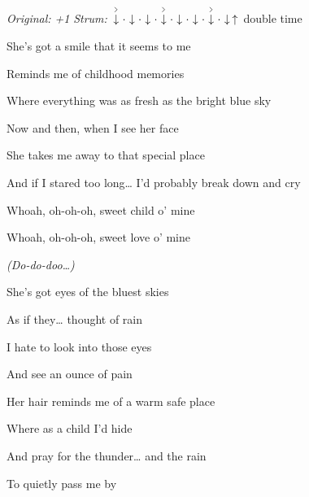 \begin{song}


\begin{headerbox}
\RaiseBoxWithAccents
{} \quad
\textit{Original: +1} \quad
\textit{Strum:} $\AccentDown\Miss\Down\Miss\Down\Miss\AccentDown\Miss \Down\Miss\Down\Miss\AccentDown\Miss\Down\Up$ double time
\end{headerbox}

\begin{vchordbox}
\end{vchordbox}

\large

\bigskip

     \par

\bigskip

She's got a smile that it seems to me \par
Reminds me of childhood memories \par
Where everything was as fresh as the bright blue sky \par
{}Now and then, when I see her face \par
She takes me away to that special place \par
And if I stared too long… I'd probably break down and cry \par

\bigskip

Whoah, oh-oh-oh, sweet child o' mine \par
{}Whoah, oh-oh-oh, sweet love o' mine \par

\bigskip

\textit{(Do-}\textit{do-doo…)}    \par

\bigskip

She's got eyes of the bluest skies \par
As if they… thought of rain \par
I hate to look into those eyes \par
And see an ounce of pain \par
Her hair reminds me of a warm safe place \par
Where as a child I'd hide \par
And pray for the thunder… and the rain \par
To quietly pass me by \par


\end{song}
